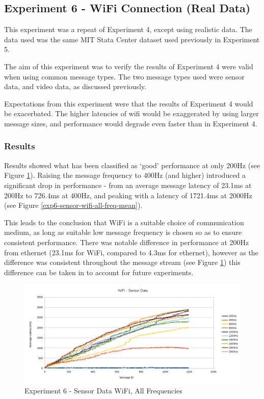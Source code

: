 \documentclass[../dissertation.tex]{subfiles}
\begin{document}
\subsection{Experiment 6 - WiFi Connection (Real Data)}

This experiment was a repeat of Experiment 4, except using realistic data. The data used was the same MIT Stata Center dataset used previously in Experiment 5.

The aim of this experiment was to verify the results of Experiment 4 were valid when using common message types. The two message types used were sensor data, and video data, as discussed previously.

Expectations from this experiment were that the results of Experiment 4 would be exacerbated. The higher latencies of wifi would be exaggerated by using larger message sizes, and performance would degrade even faster than in Experiment 4.

\subsubsection{Results}

Results showed what has been classified as `good' performance at only 200Hz (see Figure \ref{exp6-sensor-wifi-all-freq-stream}). Raising the message frequency to 400Hz (and higher) introduced a significant drop in performance - from an average message latency of 23.1ms at 200Hz to 726.4ms at 400Hz, and peaking with a latency of 1721.4ms at 2000Hz (see Figure \ref{exp6-sensor-wifi-all-freq-mean}).

This leads to the conclusion that WiFi is a suitable choice of communication medium, as long as suitable low message frequency is chosen so as to ensure consistent performance. There was notable difference in performance at 200Hz from ethernet (23.1ms for WiFi, compared to 4.3ms for ethernet), however as the difference was consistent throughout the message stream (see Figure \ref{exp6-sensor-wifi-all-freq-stream}) this difference can be taken in to account for future experiments.

\begin{figure}[H]
\centering
\includegraphics[width=\textwidth]{images/experiment6/sensor_data_wifi_all_freqs_stream.png}
\caption{Experiment 6 - Sensor Data WiFi, All Frequencies}
\label{exp6-sensor-wifi-all-freq-stream}
\end{figure}
\end{document}
